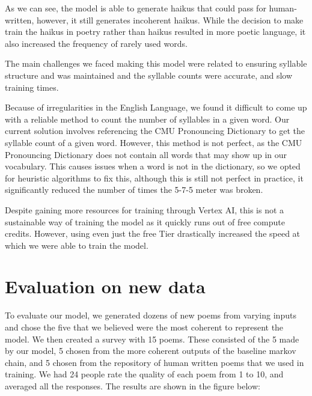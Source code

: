 \documentclass{article} %
\begin{document}
As we can see, the model is able to generate haikus that could pass for human-written, however, it still generates
incoherent haikus.
While the decision to make train the haikus in poetry rather than haikus resulted in more poetic language,
it also increased the frequency of rarely used words.

The main challenges we faced making this model were
related to ensuring syllable structure and was maintained and the syllable counts were accurate, and
slow training times.

Because of irregularities in the English Language, we found it difficult to
come up with a reliable method to count the number of syllables in a given word. Our current solution involves referencing
the CMU Pronouncing Dictionary \citep{cmu_pronouncing_dictionary} to get the syllable count of a given word.
However, this method is not perfect, as the CMU Pronouncing Dictionary does not contain all words that may show up in our vocabulary.
This causes issues when a word is not in the dictionary, so we opted for heuristic algorithms to fix this,
although this is still not perfect in practice, it significantly reduced the number of times the 5-7-5 meter was broken.

Despite gaining more resources for training through Vertex AI,
this is not a sustainable way of training the model as it quickly runs out of free compute credits.
However, using even just the free Tier drastically increased the speed at which we were able to train the model.

\section{Evaluation on new data}
To evaluate our model, we generated dozens of new poems from varying inputs and chose the five that we believed were the most coherent to represent the model. We then created a survey with 15 poems. These consisted of the 5 made by our model, 5 chosen from the more coherent outputs of the baseline markov chain, and 5 chosen from the repository of human written poems that we used in training. We had 24 people rate the quality of each poem from 1 to 10, and averaged all the responses. The results are shown in the figure below:
\end{document}
